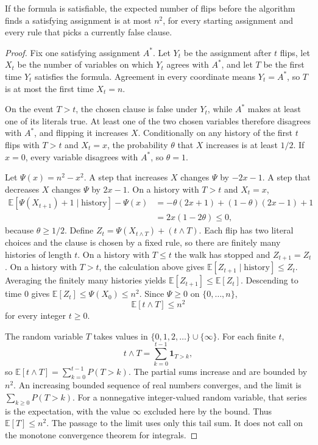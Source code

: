 \begin{theorem}[Papadimitriou]\label{thm:twosat}
If the formula is satisfiable, the expected number of flips before the algorithm finds a satisfying assignment is at most $n^2$, for every starting assignment and every rule that picks a currently false clause.
\end{theorem}
\begin{proof}
Fix one satisfying assignment $A^*$. Let $Y_t$ be the assignment after $t$ flips, let $X_t$ be the number of variables on which $Y_t$ agrees with $A^*$, and let $T$ be the first time $Y_t$ satisfies the formula. Agreement in every coordinate means $Y_t=A^*$, so $T$ is at most the first time $X_t=n$.

On the event $T>t$, the chosen clause is false under $Y_t$, while $A^*$ makes at least one of its literals true. At least one of the two chosen variables therefore disagrees with $A^*$, and flipping it increases $X$. Conditionally on any history of the first $t$ flips with $T>t$ and $X_t=x$, the probability $\theta$ that $X$ increases is at least $1/2$. If $x=0$, every variable disagrees with $A^*$, so $\theta=1$.

Let $\Psi(x)=n^2-x^2$. A step that increases $X$ changes $\Psi$ by $-2x-1$. A step that decreases $X$ changes $\Psi$ by $2x-1$. On a history with $T>t$ and $X_t=x$,
\begin{align*}
 \mathbb E[\Psi(X_{t+1})+1\mid\text{history}]-\Psi(x)
 &=-\theta(2x+1)+(1-\theta)(2x-1)+1\\
 &=2x(1-2\theta)\le0,
\end{align*}
because $\theta\ge1/2$. Define $Z_t=\Psi(X_{t\wedge T})+(t\wedge T)$. Each flip has two literal choices and the clause is chosen by a fixed rule, so there are finitely many histories of length $t$. On a history with $T\le t$ the walk has stopped and $Z_{t+1}=Z_t$. On a history with $T>t$, the calculation above gives $\mathbb E[Z_{t+1}\mid\text{history}]\le Z_t$. Averaging the finitely many histories yields $\mathbb E[Z_{t+1}]\le\mathbb E[Z_t]$. Descending to time $0$ gives $\mathbb E[Z_t]\le\Psi(X_0)\le n^2$. Since $\Psi\ge0$ on $\{0,\ldots,n\}$,
\[
 \mathbb E[t\wedge T]\le n^2
\]
for every integer $t\ge0$.

The random variable $T$ takes values in $\{0,1,2,\ldots\}\cup\{\infty\}$. For each finite $t$,
\[
 t\wedge T=\sum_{k=0}^{t-1}\mathbf 1_{T>k},
\]
so $\mathbb E[t\wedge T]=\sum_{k=0}^{t-1}P(T>k)$. The partial sums increase and are bounded by $n^2$. An increasing bounded sequence of real numbers converges, and the limit is $\sum_{k\ge0}P(T>k)$. For a nonnegative integer-valued random variable, that series is the expectation, with the value $\infty$ excluded here by the bound. Thus $\mathbb E[T]\le n^2$. The passage to the limit uses only this tail sum. It does not call on the monotone convergence theorem for integrals.
\end{proof}

